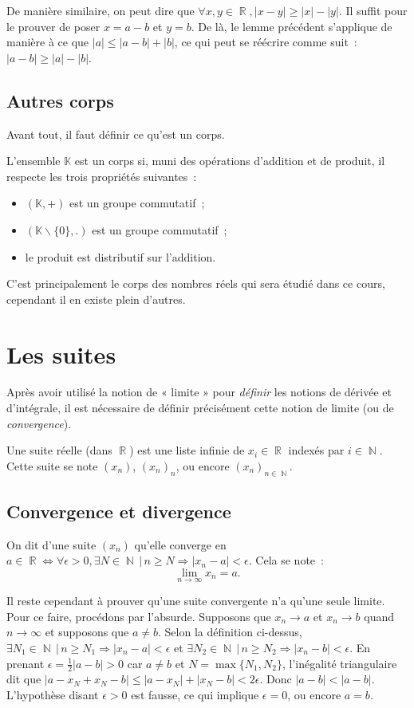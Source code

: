 \documentclass{article}
\DeclareMathOperator{\N}{\mathbb N}
\DeclareMathOperator{\R}{\mathbb R}
\theoremstyle{definition}
\theoremstyle{remark}
\begin{document}
		De manière similaire, on peut dire que $\forall x, y \in \R, |x - y| \geq |x| - |y|$. Il suffit pour le prouver de poser $x = a - b$ et $y = b$.
		De là, le lemme précédent s'applique de manière à ce que $|a| \leq |a - b| + |b|$, ce qui peut se réécrire comme suit~: $|a - b| \geq |a| - |b|$.

	\subsection{Autres corps}
		Avant tout, il faut définir ce qu'est un corps.

		L'ensemble $\mathbb K$ est un corps si, muni des opérations d'addition et de produit, il respecte les trois propriétés suivantes~:
		\begin{itemize}
			\item $(\mathbb K, +)$ est un groupe commutatif~;
			\item $(\mathbb K \backslash \{0\}, .)$ est un groupe commutatif~;
			\item le produit est distributif sur l'addition.
		\end{itemize}

		C'est principalement le corps des nombres réels qui sera étudié dans ce cours, cependant il en existe plein d'autres.

\newpage
\section{Les suites}
	Après avoir utilisé la notion de « limite » pour \textit{définir} les notions de dérivée et d'intégrale, il est nécessaire de définir précisément
	cette notion de limite (ou de \textit{convergence}).

	Une suite réelle (dans $\R$) est une liste infinie de $x_i \in \R$ indexés par $i \in \N$. Cette suite se note $(x_n)$, $(x_n)_n$, ou
	encore $(x_n)_{n \in \N}$.

	\subsection{Convergence et divergence}
		On dit d'une suite $(x_n)$ qu'elle converge en $a \in \R \iff \forall \epsilon > 0, \exists N \in \N \, | \, n \geq N \Rightarrow |x_n - a| < \epsilon$.
		Cela se note~:
		\[\lim_{n \to \infty}x_n = a.\]

		Il reste cependant à prouver qu'une suite convergente n'a qu'une seule limite. Pour ce faire, procédons par l'absurde. Supposons que
		$x_n \to a$ et $x_n \to b$ quand $n \to \infty$ et supposons que $a \neq b$. Selon la définition ci-dessus,
		$\exists N_1 \in \N \, | \, n \geq N_1 \Rightarrow |x_n - a| < \epsilon$ et
		$\exists N_2 \in \N \, | \, n \geq N_2 \Rightarrow |x_n - b| < \epsilon$. En prenant $\epsilon = \frac 12|a - b| > 0$ car $a \neq b$
		et $N = \max\{N_1, N_2\}$, l'inégalité triangulaire dit que $|a - x_N + x_N - b| \leq |a - x_N| + |x_N - b| < 2\epsilon$. Donc $|a - b| < |a - b|$.
		L'hypothèse disant $\epsilon > 0$ est fausse, ce qui implique $\epsilon = 0$, ou encore $a = b$.
\end{document}
